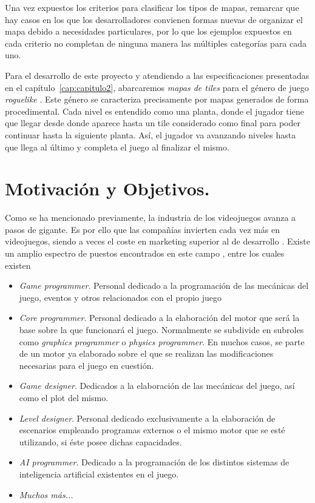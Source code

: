 Una vez expuestos los criterios para clasificar los tipos de mapas, remarcar que hay casos en los que los desarrolladores convienen formas nuevas de organizar el mapa debido a necesidades particulares, por lo que los ejemplos expuestos en cada criterio no completan de ninguna manera las múltiples categorías para cada uno.

Para el desarrollo de este proyecto y atendiendo a las especificaciones presentadas en el capítulo~\ref{cap:capitulo2}, abarcaremos \emph{mapas de tiles} para el género de juego \emph{roguelike} \cite{rlike}. Este género se caracteriza precisamente por mapas generados de forma procedimental. Cada nivel es entendido como una planta, donde el jugador tiene que llegar desde donde aparece hasta un tile considerado como final para poder continuar hasta la siguiente planta. Así, el jugador va avanzando niveles hasta que llega al último y completa el juego al finalizar el mismo.



\section*{Motivación y Objetivos.}

Como se ha mencionado previamente, la industria de los videojuegos avanza a pasos de gigante. Es por ello que las compañías invierten cada vez más en videojuegos, siendo a veces el coste en marketing superior al de desarrollo \cite{costgames}. Existe un amplio espectro de puestos encontrados en este campo \cite{gdroles1} \cite{gdroles2}, entre los cuales existen

\begin{itemize}
	\item \emph{Game programmer}. Personal dedicado a la programación de las mecánicas del juego, eventos y otros relacionados con el propio juego
	\item \emph{Core programmer}. Personal dedicado a la elaboración del motor que será la base sobre la que funcionará el juego. Normalmente se subdivide en subroles como \emph{graphics programmer} o \emph{physics programmer}. En muchos casos, se parte de un motor ya elaborado sobre el que se realizan las modificaciones necesarias para el juego en cuestión.
	\item \emph{Game designer}. Dedicados a la elaboración de las mecánicas del juego, así como el plot del mismo.
	\item \emph{Level designer}. Personal dedicado exclusivamente a la elaboración de escenarios empleando programas externos o el mismo motor que se esté utilizando, si éste posee dichas capacidades.
	\item \emph{AI programmer}. Dedicado a la programación de los distintos sistemas de inteligencia artificial existentes en el juego.
	\item \emph{Muchos más...}
\end{itemize}

